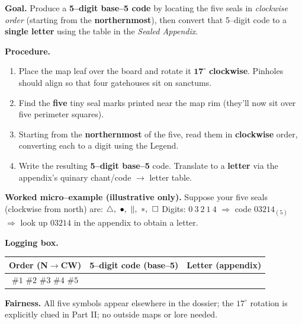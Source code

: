\documentclass[11pt]{article}
\numberwithin{equation}{section} %
\theoremstyle{plain} %
\theoremstyle{definition} %
\theoremstyle{remark} %
\begin{document}
\medskip
\noindent\textbf{Goal.} Produce a \textbf{5–digit base–5 code} by locating the five seals in \emph{clockwise order} (starting from the \textbf{northernmost}), then convert that 5–digit code to a \textbf{single letter} using the table in the \emph{Sealed Appendix}.

\medskip
\noindent\textbf{Procedure.}
\begin{enumerate}\setlength\itemsep{0.2em}
  \item Place the map leaf over the board and rotate it \(\mathbf{17^\circ}\) \textbf{clockwise}. Pinholes should align so that four gatehouses sit on sanctums.
  \item Find the \textbf{five} tiny seal marks printed near the map rim (they’ll now sit over five perimeter squares).
  \item Starting from the \textbf{northernmost} of the five, read them in \textbf{clockwise} order, converting each to a digit using the Legend.
  \item Write the resulting \textbf{5–digit base–5} code. Translate to a \textbf{letter} via the appendix’s quinary chant/code \(\rightarrow\) letter table.
\end{enumerate}

\medskip
\noindent\textbf{Worked micro–example (illustrative only).}  
Suppose your five seals (clockwise from north) are: \(\triangle,\ \bullet,\ \Vert,\ \large\ast,\ \square\)  
Digits: \(0\ 3\ 2\ 1\ 4\) \(\Rightarrow\) code \(03214_{(5)}\) \(\Rightarrow\) look up \(03214\) in the appendix to obtain a letter.

\medskip
\noindent\textbf{Logging box.}
\begin{center}
\begin{tabular}{c|c|c}
\textbf{Order (N\(\rightarrow\)CW)} & \textbf{5–digit code (base–5)} & \textbf{Letter (appendix)} \\
\hline
\(\#1\) \(\#2\) \(\#3\) \(\#4\) \(\#5\) & \hspace{3.5cm} & \hspace{1.2cm} \\
\end{tabular}
\end{center}

\medskip
\noindent\textbf{Fairness.} All five symbols appear elsewhere in the dossier; the \(17^\circ\) rotation is explicitly clued in Part II; no outside maps or lore needed.
\end{document}

